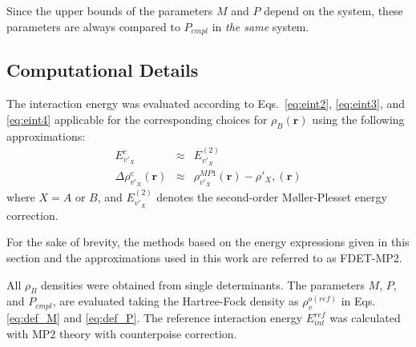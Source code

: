 \documentclass[amsmath,amssymb,preprint,aip,jcp]{revtex4-1}
\begin{document}

Since the upper bounds of the parameters $M$ and $P$ depend on the system, these parameters are always compared to $P_{cmpl}$ 
in {\it the same} system.

\subsection{Computational Details}
The interaction energy was evaluated according to Eqs.~\ref{eq:eint2}, \ref{eq:eint3}, and \ref{eq:eint4} applicable for the corresponding choices for $\rho_B(\mathbf{r})$ using the following approximations:
\begin{eqnarray}
E^{c}_{v'_X}&\approx&E_{v'_X}^{(2)} \label{eq:appr_ec}\\
\Delta \rho^{c}_{v'_X}(\mathbf{r})&\approx&\rho_{v'_X}^{MP1}(\mathbf{r})-\rho'_{X},(\mathbf{r}) \label{eq:appr_rc}
\end{eqnarray}
where $X=A$ or $B$, and $E_{v'_X}^{(2)}$ denotes the second-order M{\o}ller-Plesset energy correction.

For the sake of brevity, the methods based on the energy expressions given in this section and the approximations used in this work are referred to as FDET-MP2. 

All $\rho_B$ densities were obtained from single determinants. The parameters $M$, $P$, and $P_{cmpl}$, are evaluated taking the Hartree-Fock density as $\rho_{v}^{o(ref)}$ in Eqs.  \ref{eq:def_M} and \ref{eq:def_P}.
The reference interaction energy $E_{int}^{ref}$ was calculated with MP2 theory with counterpoise correction.
\end{document}
